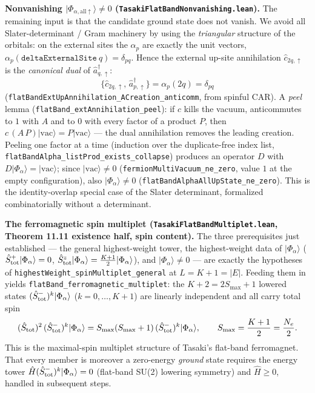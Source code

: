 \documentclass[a4paper,11pt]{article}
\begin{document}
\medskip
\noindent\textbf{Nonvanishing $|\Phi_{\alpha,\mathrm{all}\uparrow}\rangle\neq 0$
(\texttt{TasakiFlatBandNonvanishing.lean}).}
The remaining input is that the candidate ground state does not vanish. We avoid
all Slater-determinant / Gram machinery by using the \emph{triangular} structure
of the orbitals: on the external sites the $\alpha_p$ are exactly the unit
vectors, $\alpha_p(\texttt{deltaExternalSite}\ q) = \delta_{pq}$. Hence the
external up-site annihilation $\hat c_{2q,\uparrow}$ is the \emph{canonical dual}
of $\hat a^\dagger_{q,\uparrow}$:
\[
  \{\hat c_{2q,\uparrow},\, \hat a^\dagger_{p,\uparrow}\}
    = \alpha_p(2q) = \delta_{pq}
\]
(\texttt{flatBandExtUpAnnihilation\_ACreation\_anticomm}, from spinful CAR). A
\emph{peel} lemma (\texttt{flatBand\_extAnnihilation\_peel}): if $c$ kills the
vacuum, anticommutes to $1$ with $A$ and to $0$ with every factor of a product
$P$, then $c\,(A\,P)|\mathrm{vac}\rangle = P|\mathrm{vac}\rangle$ --- the dual
annihilation removes the leading creation. Peeling one factor at a time
(induction over the duplicate-free index list,
\texttt{flatBandAlpha\_listProd\_exists\_collapse}) produces an operator $D$ with
$D|\Phi_\alpha\rangle = |\mathrm{vac}\rangle$; since $|\mathrm{vac}\rangle\neq 0$
(\texttt{fermionMultiVacuum\_ne\_zero}, value $1$ at the empty configuration),
also $|\Phi_\alpha\rangle\neq 0$
(\texttt{flatBandAlphaAllUpState\_ne\_zero}). This is the identity-overlap special
case of the Slater determinant, formalized combinatorially without a determinant.

\medskip
\noindent\textbf{The ferromagnetic spin multiplet
(\texttt{TasakiFlatBandMultiplet.lean}, Theorem 11.11 existence half, spin
content).}
The three prerequisites just established --- the general highest-weight tower,
the highest-weight data of $|\Phi_\alpha\rangle$
($\hat S^+_{\rm tot}|\Phi_\alpha\rangle = 0$,
$\hat S^z_{\rm tot}|\Phi_\alpha\rangle = \tfrac{K+1}{2}|\Phi_\alpha\rangle$), and
$|\Phi_\alpha\rangle\neq 0$ --- are exactly the hypotheses of
\texttt{highestWeight\_spinMultiplet\_general} at $L = K+1 = |E|$. Feeding them in
yields \texttt{flatBand\_ferromagnetic\_multiplet}: the $K+2 = 2S_{\max}+1$ lowered
states $(\hat S^-_{\rm tot})^k|\Phi_\alpha\rangle$ ($k = 0,\dots,K+1$) are linearly
independent and all carry total spin
\[
  (\hat S_{\rm tot})^2\,(\hat S^-_{\rm tot})^k|\Phi_\alpha\rangle
    = S_{\max}(S_{\max}+1)\,(\hat S^-_{\rm tot})^k|\Phi_\alpha\rangle,
  \qquad S_{\max} = \frac{K+1}{2} = \frac{N_e}{2}.
\]
This is the maximal-spin multiplet structure of Tasaki's flat-band ferromagnet.
That every member is moreover a zero-energy \emph{ground} state requires the
energy tower $\hat H(\hat S^-_{\rm tot})^k|\Phi_\alpha\rangle = 0$ (flat-band
SU(2) lowering symmetry) and $\hat H\geq 0$, handled in subsequent steps.
\end{document}
